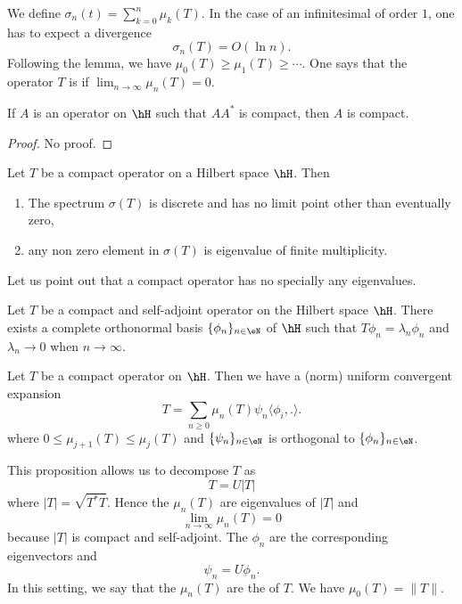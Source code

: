 We define $\sigma_n(t)=\sum_{k=0}^n\mu_k(T)$. In the case of an infinitesimal of order $1$, one has to expect a divergence 
\[ 
  \sigma_n(T)=O(\ln n).
\]
Following the lemma, we have $\mu_0(T)\geq\mu_1(T)\geq\cdots$. One says that the operator $T$ is  if $\lim_{n\to\infty}\mu_n(T)=0$.

\begin{lemma}		\label{LemAstAcomAcomp}
	If $A$ is an operator on $\hH$ such that $AA^*$ is compact, then $A$ is compact.
\end{lemma}

\begin{proof}
	No proof.
\end{proof}


\begin{proposition}
Let $T$ be a compact operator on a Hilbert space $\hH$. Then
\begin{enumerate}
\item The spectrum $\sigma(T)$ is discrete and has no limit point other than eventually zero,
\item any non zero element in $\sigma(T)$ is eigenvalue of finite multiplicity.
\end{enumerate}
\end{proposition}
Let us point out that a compact operator has no specially any eigenvalues.

\begin{proposition}
Let $T$ be a compact and self-adjoint operator on the Hilbert space $\hH$. There exists a complete orthonormal basis $\{ \phi_n \}_{n\in\eN}$ of $\hH$ such that $T\phi_n=\lambda_n\phi_n$ and $\lambda_n\to0$ when $n\to\infty$.
\end{proposition}

\begin{proposition}
Let $T$ be a compact operator on $\hH$. Then we have a (norm) uniform convergent expansion 
\[ 
  T=\sum_{n\geq 0}\mu_n(T)\psi_n\langle \phi_i, .\rangle .
\]
where $0\leq\mu_{j+1}(T)\leq\mu_j(T)$ and $\{ \psi_n \}_{n\in\eN}$ is orthogonal to $\{ \phi_n \}_{n\in\eN}$.
\end{proposition}

This proposition allows us to decompose $T$ as
\[ 
  T=U| T |
\]
where $| T |=\sqrt{T^*T}$. Hence the $\mu_n(T)$ are eigenvalues of $| T |$ and 
\[ 
  \lim_{n\to\infty}\mu_n(T)=0
\]
because $| T |$ is compact and self-adjoint. The $\phi_n$ are the corresponding eigenvectors and
\[ 
  \psi_n=U\phi_n.
\]
 In this setting, we say that the $\mu_n(T)$ are the  of $T$. We have $\mu_0(T)=\| T \|$. 

